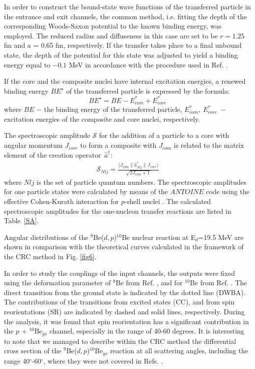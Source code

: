 \documentclass[
11pt, %
english, %
onehalfspacing, %
headsepline, %
]{MastersDoctoralThesis} %
\begin{document}
In order to construct the bound-state wave functions of the transferred particle in the entrance and exit channels, the common method, i.e. fitting the depth of the corresponding Woods-Saxon potential to the known binding energy, was employed. The reduced radius and diffuseness in this case are set to be $r = 1.25$ fm and $a$ = 0.65 fm, respectively. If the transfer takes place to a final unbound state, the depth of the potential for this state was adjusted to yield a binding energy equal to $-0.1$ MeV in accordance with the procedure used in Ref. \cite{harakeh1980}.

If the core and the composite nuclei have internal excitation energies, a renewed binding energy $BE^{\star}$ of the transferred particle is expressed by the formula:
\begin{equation} BE^{\star}=BE - E_{com}^*+E_{core}^* \end{equation}
where $BE$ $-$ the binding energy of the transferred particle, $E_{com}^*,~E_{core}^*~-$  excitation energies of the composite and  core nuclei, respectively.

The spectroscopic amplitude  $\mathcal{S}$ for the addition of a particle to a core with angular momentum $J_{core}$ to form a composite with $J_{com}$ is related to the matrix element of the creation operator~$\hat{a}^\dagger$:
\begin{eqnarray}\label{eq:SA}
\mathcal{S}_{Nlj} = \frac{\langle J_{com} \| \hat{a}^\dagger _{Nlj} \| J_{core}  \rangle}{\sqrt{2J_{com}+1}}
\end{eqnarray}
where $Nlj$ is the set of particle quantum numbers. The spectroscopic amplitudes for one particle states were calculated by means of the $ANTOINE$ code \cite{antoine}  using the effective Cohen-Kurath interaction for $p$-shell nuclei \cite{cohen1965}. The calculated spectroscopic amplitudes for the one-nucleon transfer reactions are listed in Table~\ref{SA}.



Angular distributions of the ${}^9$Be($d,p$)${}^{10}$Be nuclear reaction at E$_d$=19.5 MeV are shown in comparison with the theoretical curves  calculated in the framework of the CRC method in Fig. \ref{fig6}.

In order to study the couplings of the input  channels, the outputs  were fixed using the deformation parameter of $^8$Be from Ref. \cite{rocca2018}, and for $^{10}$Be from Ref. \cite{harakeh1980}. 
The direct transition from the ground state is indicated by the dotted line (DWBA). 
The contributions of the transitions from excited states (CC), and from spin reorientations (SR) are indicated by dashed and solid lines, respectively.
During the analysis, it was found that spin reorientation has a significant contribution in the $p$ + $^{10}$Be$_{gs}$ channel, especially in the range of 40-60 degrees. 
It is interesting to note that we managed to describe within the CRC method the differential cross section of the ${}^9$Be($d,p$)${}^{10}$Be$_{gs}$ reaction at all scattering angles, including the range 40$^\circ$-60$^\circ$, where they were not covered in Refs. \cite{galanina2012, bodek1989}.
 
\end{document}
